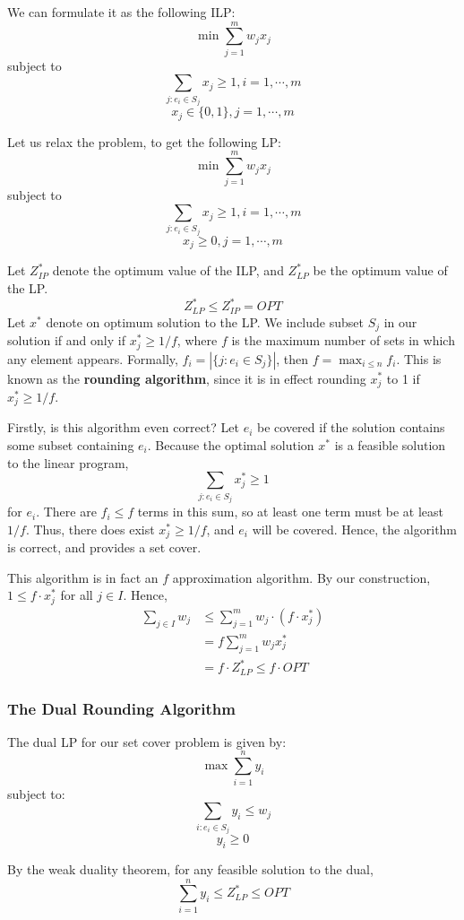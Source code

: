 \documentclass[12pt,letterpaper]{article}
\theoremstyle{definition}
\begin{document}
We can formulate it as the following ILP:
\[\min \sum_{j=1}^m w_jx_j\]
subject to
\[\sum_{j : e_i \in S_j } x_j \geq 1, i = 1, \cdots, m\]
\[x_j \in \{0,1\}, j = 1, \cdots, m\]

Let us relax the problem, to get the following LP:
\[\min \sum_{j=1}^m w_jx_j\]
subject to
\[\sum_{j : e_i \in S_j } x_j \geq 1, i = 1, \cdots, m\]
\[x_j \geq 0, j = 1, \cdots, m\]

Let $Z_{IP}^*$ denote the optimum value of the ILP, and $Z_{LP}^*$ be the optimum value of the LP.
\[Z_{LP}^* \leq Z_{IP}^* = OPT\]
Let $x^*$ denote on optimum solution to the LP. We include subset $S_j$ in our solution if and only if $x_j^* \geq 1/f$, where $f$ is the maximum number of sets in which any element appears. Formally, $f_i = |\{j : e_i \in S_j\}|$, then $f = \max_{i \leq n} f_i$. This is known as the \textbf{rounding algorithm}, since it is in effect rounding $x_j^*$ to 1 if $x_j^* \geq 1/f$.

Firstly, is this algorithm even correct? Let $e_i$ be covered if the solution contains some subset containing $e_i$. Because the optimal solution $x^*$ is a feasible solution to the linear program,
\[\sum_{j : e_i \in S_j} x_j^* \geq 1\]
for $e_i$. There are $f_i \leq f$ terms in this sum, so at least one term must be at least $1/f$. Thus, there does exist $x_j^* \geq 1/f$, and $e_i$ will be covered. Hence, the algorithm is correct, and provides a set cover.

This algorithm is in fact an $f$ approximation algorithm. By our construction, $1 \leq f \cdot x_j^*$ for all $j \in I$. Hence,
\begin{align*}
  \sum_{j \in I}  w_j &\leq \sum_{j=1}^m w_j \cdot (f \cdot x_j^*) \\
                      &= f \sum_{j=1}^m w_j x_j^* \\
                      &= f \cdot Z_{LP}^*
                      \leq f \cdot OPT
\end{align*}

\subsubsection{The Dual Rounding Algorithm}

The dual LP for our set cover problem is given by:
\[\max \sum_{i=1}^n y_i\]
subject to:
\[\sum_{i : e_i \in S_j} y_i \leq w_j\]
\[y_i \geq 0\]

By the weak duality theorem, for any feasible solution to the dual,
\[\sum_{i=1}^n y_i \leq Z_{LP}^* \leq OPT\]
\end{document}
